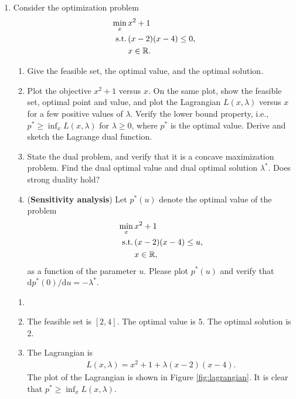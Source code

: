 \begin{exercise}
    \begin{enumerate}
        \item
            Consider the optimization problem
            \begin{align*}
                \min_x\,     & x^2+1            \\
                {\rm s.t.}\, & (x-2)(x-4)\le 0, \\
                             & x\in\mathbb{R}.
            \end{align*}
            \begin{enumerate}
                \item
                    Give the feasible set, the optimal value, and the optimal solution.
                \item
                    Plot the objective $x^2+1$ versus $x$. On the same plot, show the feasible set, optimal point and value, and plot the Lagrangian $L(x, \lambda)$ versus $x$ for a few positive values of $\lambda$. Verify the lower bound property, i.e., $p^* \ge \inf_x L(x, \lambda)$ for $\lambda\ge 0$, where $p^*$ is the optimal value. Derive and sketch the Lagrange dual function.
                \item
                    State the dual problem, and verify that it is a concave maximization problem. Find the dual optimal value and dual optimal solution $\lambda^*$. Does strong duality hold?
                \item
                    ({\bf Sensitivity analysis}) Let $p^*(u)$ denote the optimal value of the problem
                    \begin{align*}
                        \min_x\,     & x^2+1            \\
                        {\rm s.t.}\, & (x-2)(x-4)\le u, \\
                                     & x\in\mathbb{R},
                    \end{align*}
                    as a function of the parameter $u$. Please plot $p^*(u)$ and verify that $\mathrm{d}p^*(0)/\mathrm{d}u=-\lambda^*$.
            \end{enumerate}

            \begin{solution}
                \begin{enumerate}
                    \item []
                    \item The feasible set is $[2,4]$.
                        The optimal value is $5$. The optimal solution is $2$.
                    \item The Lagrangian is
                        \begin{align*}
                            L(x, \lambda) = x^2+1+\lambda(x-2)(x-4).
                        \end{align*}
                        The plot of the Lagrangian is shown in Figure \ref{fig:lagrangian}. It is clear that $p^* \ge \inf_x L(x, \lambda)$.


\end{enumerate}
\end{solution}
\end{enumerate}
\end{exercise}
